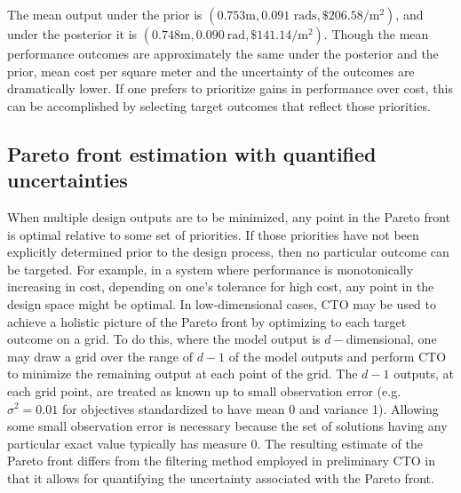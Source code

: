 \documentclass[12pt]{article}
\begin{document}
The mean output under the prior is $(0.753\mathrm m,0.091\text{ rads},\$206.58/\mathrm m^2)$, and under the posterior it is $(0.748\mathrm m,0.090\ \mathrm{rad},\$141.14/\mathrm m^2)$.
%
Though the mean performance outcomes are approximately the same under the posterior and the prior, mean cost per square meter and the uncertainty of the outcomes are dramatically lower.
%
If one prefers to prioritize gains in performance over cost, this can be accomplished by selecting target outcomes that reflect those priorities.
%

%
\subsection{Pareto front estimation with quantified uncertainties}\label{removing_cal_pars}


%
When multiple design outputs are to be minimized, any point in the Pareto front is optimal relative to some set of priorities.
%
If those priorities have not been explicitly determined prior to the design process, then no particular outcome can be targeted.
%
%
For example, in a system where performance is monotonically increasing in cost, depending on one's tolerance for high cost, any point in the design space might be optimal.
%
%
In low-dimensional cases, CTO may be used to achieve a holistic picture of the Pareto front by optimizing to each target outcome on a grid.
%
To do this, where the model output is $d-$dimensional, one may draw a grid over the range of $d-1$ of the model outputs and perform CTO to minimize the remaining output at each point of the grid.
%
The $d-1$ outputs, at each grid point, are treated as known up to small observation error (e.g. $\sigma^2=0.01$ for objectives standardized to have mean 0 and variance 1).
%
Allowing some small observation error is necessary because the set of solutions having any particular exact value typically has measure 0.
%
The resulting estimate of the Pareto front differs from the filtering method employed in preliminary CTO in that it allows for quantifying the uncertainty associated with the Pareto front.
%
\end{document}
